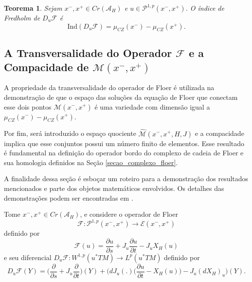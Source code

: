\documentclass[12pt]{book}
\newtheorem{teorema}{Teorema}[section]
\newcommand{\bigparenteses}[1]{\Big( #1 \Big) }
\newcommand{\caminhosexponenciaisconectantes}[2]{\mathcal{P}^{1,p}(#1, #2)}
\newcommand{\caminhosexponenciaisconectantespadrao}{\caminhosexponenciaisconectantes{x^{-}}{x^{+}}}
\newcommand{\diferencialfloerponto}[1]{D_{#1}\operadorFloer}
\newcommand{\derivadaparcial}[2]{\frac{\partial #1}{\partial #2}}
\newcommand{\diferencialhamiltoniano}[1]{(dX_{H})_{#1}}
\newcommand{\energiafinitaM}{\mathcal{M}}
\newcommand{\energiafinitaMconectante}{\energiafinitaM(x^{-}, x^{+})}
\newcommand{\espacoLp}[1]{L^{p}(#1)}
\newcommand{\espacosobolev}[1]{W^{1,p}(#1)}
\newcommand{\fibradocaminhosexponenciais}{\mathcal{E}(x^{-}, x^{+})}
\newcommand{\funcionalH}{\mathcal{A}_{H}}
\newcommand{\iconley}[1]{\iconleyabrev(#1)}
\newcommand{\iconleyabrev}{\mu_{CZ}}
\newcommand{\ind}{\text{Ind}}
\newcommand{\operadorFloer}{\mathcal{F}}
\newcommand{\operadorFloerDefinicao}[1]{\derivadaparcial{#1}{s} + J_{#1}\derivadaparcial{#1}{t} - J_{#1}X_{H}(#1)}
\newcommand{\operadorFloerParametro}[1]{\mathcal{F}(#1)}
\newcommand{\pontoscriticos}[1]{\textit{Cr}(#1)}
\newcommand{\pullbackfibradotangente}[2]{#1^{*}T#2}
\newcommand{\pullbackfibradotangenteM}[1]{\pullbackfibradotangente{#1}{M}}
\newcommand{\quocientetrajetorias}{\widehat{\energiafinitaM}(x^{-}, x^{+}, H, J)}
\begin{document}
	\begin{teorema}\label{teorema_indice_diferencial_operador_floer}
		Sejam $ x^{-}, x^{+} \in \pontoscriticos{\funcionalH}$ e $u\in \caminhosexponenciaisconectantespadrao$. O índice de Fredholm de $\diferencialfloerponto{u}$ é
		$$
		\ind(\diferencialfloerponto{u}) = \iconley{x^{-}}-\iconley{x^{+}}.
		$$
	\end{teorema}
	
	\subsection{A Transversalidade do Operador $\operadorFloer$ e a Compacidade de $\energiafinitaMconectante$}\label{secao_transversalidade_compacidade_M}
	
	A propriedade da transversalidade do operador de Floer é utilizada na demonstração de que o espaço das soluções da equação de Floer que conectam esse dois pontos $\energiafinitaMconectante$ é uma variedade com dimensão igual a $\iconley{x^{-}}-\iconley{x^{+}}$.
	
	Por fim, será introduzido o espaço quociente $\quocientetrajetorias$ e a compacidade implica que esse conjuntos possui um número finito de elementos. Esse resultado é fundamental na definição do operador bordo do complexo de cadeia de Floer e sua homologia definidos na Seção \ref{secao_complexo_floer}.
	
	A finalidade dessa seção é esboçar um roteiro para a demonstração dos resultados mencionados e parte dos objetos matemáticos envolvidos. Os detalhes das demonstrações podem ser encontradas em \cite{audi_floer_homology}.
	
	Tome $x^{-},x^{+}\in \pontoscriticos{\funcionalH}$, e considere o operador de Floer 
	$$
	\operadorFloer: \caminhosexponenciaisconectantespadrao \to \fibradocaminhosexponenciais
	$$  
	definido por
	$$
	\operadorFloerParametro{u} =\operadorFloerDefinicao{u}
	$$
	e seu diferencial $\diferencialfloerponto{u}: \espacosobolev{\pullbackfibradotangenteM{u}} \to \espacoLp{\pullbackfibradotangenteM{u}}$ definido por
	$$
	\diferencialfloerponto{u}(Y)= \Big( \derivadaparcial{}{s} + J_{u}\derivadaparcial {}{t}\Big)(Y)+ \Big(dJ_{u}(.)\bigparenteses{\derivadaparcial{u}{t} - X_{H}(u)} - J_{u} \diferencialhamiltoniano{u}\Big)(Y).
	$$
	
\end{document}

